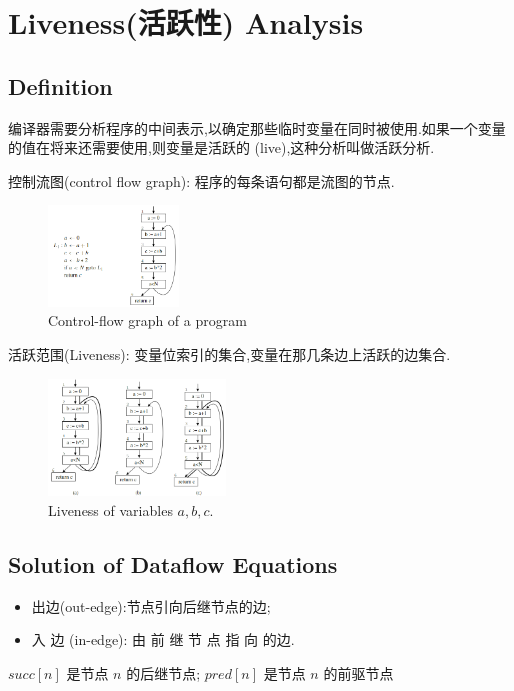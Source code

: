 \newpage
\section{Liveness(活跃性) Analysis}
\subsection{Definition}
编译器需要分析程序的中间表示,以确定那些临时变量在同时被使用.如果一个变量的值在将来还需要使用,则变量是活跃的 (live),这种分析叫做活跃分析.

控制流图(control flow graph): 程序的每条语句都是流图的节点.


\begin{figure}[!htb]
    \centering
    \includegraphics[width=0.309\textwidth]{pic/CP10/Control-flow graph of a program}
    \caption{Control-flow graph of a program}
\end{figure}


活跃范围(Liveness): 变量位索引的集合,变量在那几条边上活跃的边集合.

\begin{figure}[!htb]
    \centering
    \includegraphics[width=0.42\textwidth]{pic/CP10/Liveness of variables}
    \caption{Liveness of variables $a, b, c$.}
\end{figure}

\subsection{Solution of Dataflow Equations}

\begin{itemize}
    \item 出边(out-edge):节点引向后继节点的边; 
    \item 入 边 (in-edge): 由 前 继 节 点 指 向 的边.
\end{itemize}
$succ[n]$ 是节点 $n$ 的后继节点; $pred[n]$ 是节点 $n$ 的前驱节点


